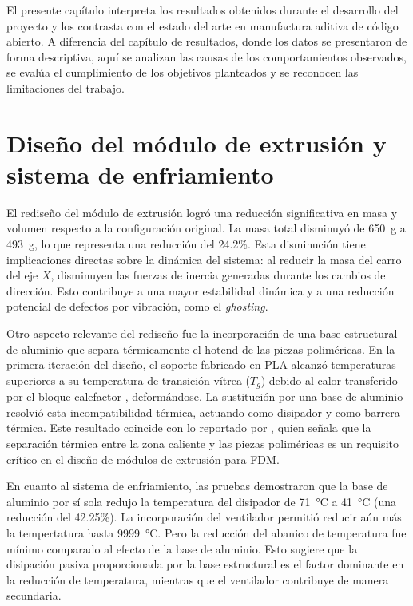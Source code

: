 El presente capítulo interpreta los resultados obtenidos durante el desarrollo del proyecto y los contrasta con el estado del arte en manufactura aditiva de código abierto. A diferencia del capítulo de resultados, donde los datos se presentaron de forma descriptiva, aquí se analizan las causas de los comportamientos observados, se evalúa el cumplimiento de los objetivos planteados y se reconocen las limitaciones del trabajo.

\section{Diseño del módulo de extrusión y sistema de enfriamiento}
\label{sec:discusion_extrusion}

El rediseño del módulo de extrusión logró una reducción significativa en masa y volumen respecto a la configuración original. La masa total disminuyó de \qty{650}{\g} a \qty{493}{\g}, lo que representa una reducción del 24.2\%. Esta disminución tiene implicaciones directas sobre la dinámica del sistema: al reducir la masa del carro del eje \(X\), disminuyen las fuerzas de inercia generadas durante los cambios de dirección. Esto contribuye a una mayor estabilidad dinámica y a una reducción potencial de defectos por vibración, como el \textit{ghosting}.

Otro aspecto relevante del rediseño fue la incorporación de una base estructural de aluminio que separa térmicamente el hotend de las piezas poliméricas. En la primera iteración del diseño, el soporte fabricado en PLA alcanzó temperaturas superiores a su temperatura de transición vítrea (\(T_g\)) debido al calor transferido por el bloque calefactor , deformándose. La sustitución por una base de aluminio resolvió esta incompatibilidad térmica, actuando como disipador y como barrera térmica. Este resultado coincide con lo reportado por \cite{gibson2021}, quien señala que la separación térmica entre la zona caliente y las piezas poliméricas es un requisito crítico en el diseño de módulos de extrusión para FDM.

En cuanto al sistema de enfriamiento, las pruebas demostraron que la base de  aluminio por sí sola redujo la temperatura del disipador de \qty{71}{\celsius} a \qty{41}{\celsius} (una reducción del 42.25\%). La incorporación del ventilador permitió reducir aún más la tempertatura hasta \qty{9999}{\celsius}. Pero la reducción del abanico de temperatura fue mínimo comparado al efecto de la base de aluminio. Esto sugiere que la disipación pasiva proporcionada por la base estructural es el factor dominante en la reducción de temperatura, mientras que el ventilador contribuye de manera secundaria.

